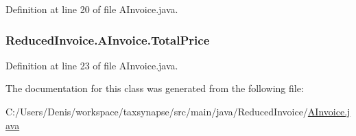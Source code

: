 Definition at line 20 of file A\+Invoice.\+java.

\subsubsection[{\texorpdfstring{Total\+Price}{TotalPrice}}]{ Reduced\+Invoice.\+A\+Invoice.\+Total\+Price\hspace{0.3cm}{\ttfamily [protected]}}\hypertarget{class_reduced_invoice_1_1_a_invoice_a72b831e7ee0b4501fc949f61aecdd498}{}\label{class_reduced_invoice_1_1_a_invoice_a72b831e7ee0b4501fc949f61aecdd498}


Definition at line 23 of file A\+Invoice.\+java.



The documentation for this class was generated from the following file\+:\begin{DoxyCompactItemize}
\item 
C\+:/\+Users/\+Denis/workspace/taxsynapse/src/main/java/\+Reduced\+Invoice/\hyperlink{_a_invoice_8java}{A\+Invoice.\+java}\end{DoxyCompactItemize}
